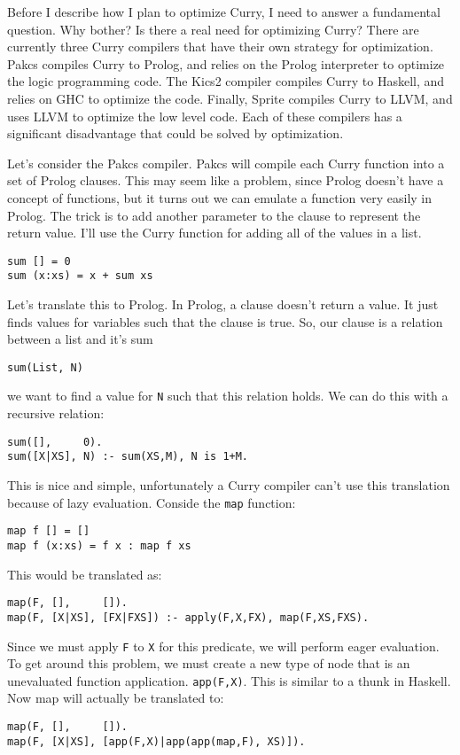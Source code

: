 
Before I describe how I plan to optimize Curry, I need to answer a fundamental question.
Why bother?
Is there a real need for optimizing Curry?
There are currently three Curry compilers that have their own strategy for optimization.
Pakcs compiles Curry to Prolog, and relies on the Prolog interpreter to optimize the logic programming code.
The Kics2 compiler compiles Curry to Haskell, and relies on GHC to optimize the code.
Finally, Sprite compiles Curry to LLVM, and uses LLVM to optimize the low level code.
Each of these compilers has a significant disadvantage that could be solved by optimization.

Let's consider the Pakcs compiler.
Pakcs will compile each Curry function into a set of Prolog clauses.
This may seem like a problem, since Prolog doesn't have a concept of functions,
but it turns out we can emulate a function very easily in Prolog.
The trick is to add another parameter to the clause to represent the return value.
I'll use the Curry function for adding all of the values in a list.

\begin{verbatim}
sum [] = 0
sum (x:xs) = x + sum xs
\end{verbatim}

Let's translate this to Prolog.
In Prolog, a clause doesn't return a value.
It just finds values for variables such that the clause is true.
So, our clause is a relation between a list and it's sum
\begin{verbatim}
sum(List, N)
\end{verbatim}
we want to find a value for \texttt{N} such that this relation holds.
We can do this with a recursive relation:
\begin{verbatim}
sum([],     0).
sum([X|XS], N) :- sum(XS,M), N is 1+M.
\end{verbatim}

This is nice and simple, unfortunately a Curry compiler can't use this translation
because of lazy evaluation.
Conside the \texttt{map} function:
\begin{verbatim}
map f [] = []
map f (x:xs) = f x : map f xs
\end{verbatim}
This would be translated as:
\begin{verbatim}
map(F, [],     []).
map(F, [X|XS], [FX|FXS]) :- apply(F,X,FX), map(F,XS,FXS).
\end{verbatim}

Since we must apply \texttt F to \texttt X for this predicate, we will perform eager evaluation.
To get around this problem, we must create a new type of node that is an unevaluated function application.
\texttt{app(F,X)}.
This is similar to a thunk in Haskell.
Now map will actually be translated to:
\begin{verbatim}
map(F, [],     []).
map(F, [X|XS], [app(F,X)|app(app(map,F), XS)]).
\end{verbatim}

